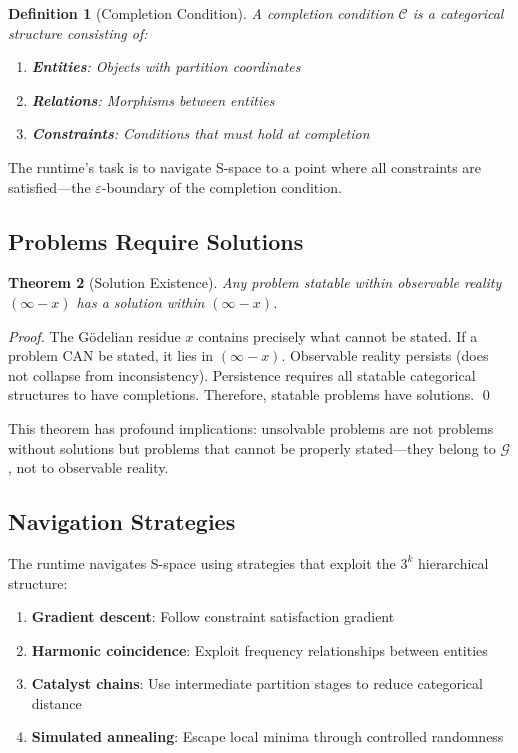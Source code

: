 \documentclass[twocolumn,10pt]{article}
\newtheorem{theorem}{Theorem}[section]
\newtheorem{definition}[theorem]{Definition}
\theoremstyle{remark}
\newcommand{\eps}{\varepsilon}
\newcommand{\Gres}{\mathcal{G}}
\begin{document}
\begin{definition}[Completion Condition]
A completion condition $\mathcal{C}$ is a categorical structure consisting of:
\begin{enumerate}
    \item \textbf{Entities}: Objects with partition coordinates
    \item \textbf{Relations}: Morphisms between entities
    \item \textbf{Constraints}: Conditions that must hold at completion
\end{enumerate}
\end{definition}

The runtime's task is to navigate S-space to a point where all constraints are satisfied---the $\eps$-boundary of the completion condition.

\subsection{Problems Require Solutions}

\begin{theorem}[Solution Existence]
\label{thm:solution_existence}
Any problem statable within observable reality $(\infty - x)$ has a solution within $(\infty - x)$.
\end{theorem}

\begin{proof}
The Gödelian residue $x$ contains precisely what cannot be stated. If a problem CAN be stated, it lies in $(\infty - x)$. Observable reality persists (does not collapse from inconsistency). Persistence requires all statable categorical structures to have completions. Therefore, statable problems have solutions. \qed
\end{proof}

This theorem has profound implications: unsolvable problems are not problems without solutions but problems that cannot be properly stated---they belong to $\Gres$, not to observable reality.

\subsection{Navigation Strategies}

The runtime navigates S-space using strategies that exploit the $3^k$ hierarchical structure:

\begin{enumerate}
    \item \textbf{Gradient descent}: Follow constraint satisfaction gradient
    \item \textbf{Harmonic coincidence}: Exploit frequency relationships between entities
    \item \textbf{Catalyst chains}: Use intermediate partition stages to reduce categorical distance
    \item \textbf{Simulated annealing}: Escape local minima through controlled randomness
\end{enumerate}
\end{document}

